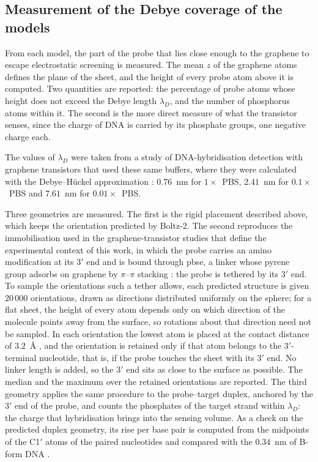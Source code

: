\subsection{Measurement of the Debye coverage of the models}
\label{sec:debyemethod}

From each model, the part of the probe that lies close enough to the graphene to escape electrostatic
screening is measured. The mean $z$ of the graphene atoms defines the plane of the sheet, and the height
of every probe atom above it is computed. Two quantities are reported: the percentage of probe atoms whose
height does not exceed the Debye length $\lambda_D$, and the number of phosphorus atoms within it. The
second is the more direct measure of what the transistor senses, since the charge of DNA is carried by its
phosphate groups, one negative charge each.

The values of $\lambda_D$ were taken from a study of DNA-hybridisation detection with graphene
transistors that used these same buffers, where they were calculated with the Debye--H\"uckel
approximation \citep{purwidyantri2021}: $0.76$~nm for $1\times$~PBS, $2.41$~nm for
$0.1\times$~PBS and $7.61$~nm for $0.01\times$~PBS.

Three geometries are measured. The first is the rigid placement described above, which keeps the
orientation predicted by Boltz-2. The second reproduces the immobilisation used in the graphene-transistor
studies that define the experimental context of this work, in which the probe carries an amino
modification at its $3'$ end and is bound through \acrfull{pbse}, a linker whose pyrene group adsorbs on
graphene by $\pi$--$\pi$ stacking \citep{campos2019,purwidyantri2021}: the probe is tethered by its $3'$
end. To sample the orientations such a tether allows, each predicted structure is given $20\,000$
orientations, drawn as directions distributed uniformly on the sphere; for a flat sheet, the height of
every atom depends only on which direction of the molecule points away from the surface, so rotations
about that direction need not be sampled. In each orientation the lowest atom is placed at the contact
distance of $3.2$~\AA{} \citep{tayo2023}, and the orientation is retained only if that atom belongs to
the $3'$-terminal nucleotide, that is, if the probe touches the sheet with its $3'$ end. No linker length
is added, so the $3'$ end sits as close to the surface as possible. The median and the maximum over the
retained orientations are reported. The third geometry applies the same procedure to the probe--target
duplex, anchored by the $3'$ end of the probe, and counts the phosphates of the target strand within
$\lambda_D$: the charge that hybridisation brings into the sensing volume. As a check on the predicted
duplex geometry, its rise per base pair is computed from the midpoints of the C1$'$ atoms of the paired
nucleotides and compared with the $0.34$~nm of B-form DNA \citep{watsoncrick1953}.

